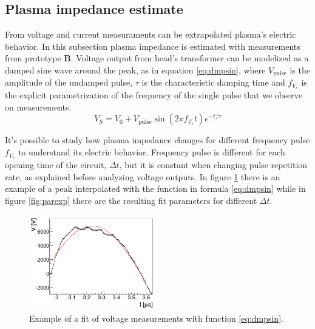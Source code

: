 \subsection{Plasma impedance estimate}
From voltage and current measuraments can be extrapolated plasma's electric behavior. In this subsection plasma impedance is estimated with measurements from prototype \textbf{B}. Voltage output from head's transformer can be modelized as a damped sine wave around the peak, as in equation \ref{eq:dmpsin}, where $V_{\text{pulse}}$ is the amplitude of the undamped pulse, $\tau$ is the characteristic damping time and $f_{V_{s}}$ is the explicit parametrization of the frequency of the single pulse that we observe on measurements.
\begin{equation}
 V_{S} = V_{0} + V_{\text{pulse}} \sin{(2 \pi f_{V_{s}} t)} e^{-t/\tau}
 \label{eq:dmpsin}
\end{equation}

It's possible to study how plasma impedance changes for different frequency pulse $f_{V_{s}}$ to understand its electric behavior. Frequency pulse is different for each opening time of the circuit, $\Delta t$, but it is constant when changing pulse repetition rate, as explained before analyzing voltage outputs. In figure \ref{fig:fitexp} there is an example of a peak interpolated with the function in formula \ref{eq:dmpsin} %
while in figure \ref{fig:parexp} there are the resulting fit parameters for different $\Delta t$.
\begin{figure}
 \centering
 \includegraphics[width=0.5\textwidth]{Images/Electric/VFitexp_f8_t5_2.png}
 \caption{Example of a fit of voltage measurements with function \ref{eq:dmpsin}.}
 \label{fig:fitexp}
\end{figure}

